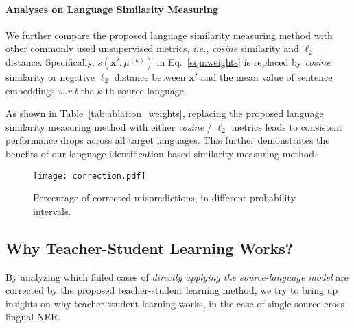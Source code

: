 \documentclass[11pt,a4paper]{article}
\newcommand\ie{\textit{i.e.}}
\newcommand\wrt{\textit{w.r.t}}
\begin{document}
	\begin{table}[t]
		\centering
		\setlength{\tabcolsep}{1.5mm}
		\caption{Comparison between the proposed language similarity measuring method and the commonly used $cosine/\ell_2$ metrics for multi-source cross-lingual NER.}
		\label{tab:ablation_weights}
	\end{table}

	\paragraph{Analyses on Language Similarity Measuring}
	We further compare the proposed language similarity measuring method with other commonly used unsupervised metrics, \ie, \textit{cosine} similarity and $\ell_2$ distance. Specifically, $s(\bm{x'}, \mu^{(k)})$ in Eq.~\ref{equ:weights} is replaced by \textit{cosine} similarity or negative $\ell_2$ distance between $\bm{x'}$ and the mean value of sentence embeddings \wrt{} the $k$-th source language. 

	As shown in Table~\ref{tab:ablation_weights}, replacing the proposed language similarity measuring method with either \textit{cosine} / $\ell_2$ metrics leads to consistent performance drops across all target languages. This further demonstrates the benefits of our language identification based similarity measuring method. 

	\begin{figure}[t]
		\centering
		\texttt{[image: correction.pdf]}
		\caption{Percentage of corrected mispredictions, in different probability intervals.}
		\label{fig:correction}
	\end{figure}

	\subsection{Why Teacher-Student Learning Works?}
	\label{sec:case_study}
	By analyzing which failed cases of \emph{directly applying the source-language model} are corrected by the proposed teacher-student learning method, we try to bring up insights on why teacher-student learning works, in the case of single-source cross-lingual NER.
\end{document}
